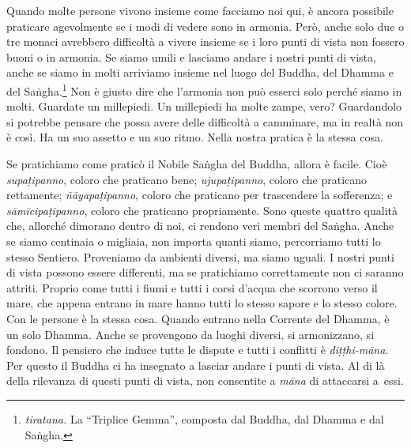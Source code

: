 Quando molte persone vivono insieme come facciamo noi qui, è ancora
possibile praticare agevolmente se i modi di vedere sono in armonia.
Però, anche solo due o tre monaci avrebbero difficoltà a vivere insieme
se i loro punti di vista non fossero buoni o in armonia. Se siamo umili
e lasciamo andare i nostri punti di vista, anche se siamo in molti
arriviamo insieme nel luogo del Buddha, del Dhamma e del
Saṅgha.\footnote{\emph{tiratana.} La ``Triplice Gemma'', composta dal
  Buddha, dal Dhamma e dal Saṅgha.} Non è giusto dire che l'armonia non
può esserci solo perché siamo in molti. Guardate un millepiedi. Un
millepiedi ha molte zampe, vero? Guardandolo si potrebbe pensare che
possa avere delle difficoltà a camminare, ma in realtà non è così. Ha un
suo assetto e un suo ritmo. Nella nostra pratica è la stessa cosa.

Se pratichiamo come praticò il Nobile Saṅgha del Buddha, allora è
facile. Cioè \emph{supaṭipanno}, coloro che praticano bene;
\emph{ujupaṭipanno}, coloro che praticano rettamente;
\emph{ñāyapaṭipanno}, coloro che praticano per trascendere la
sofferenza; e \emph{sāmīcipaṭipanno}, coloro che praticano propriamente.
Sono queste quattro qualità che, allorché dimorano dentro di noi, ci
rendono veri membri del Saṅgha. Anche se siamo centinaia o migliaia, non
importa quanti siamo, percorriamo tutti lo stesso Sentiero. Proveniamo
da ambienti diversi, ma siamo uguali. I nostri punti di vista possono
essere differenti, ma se pratichiamo correttamente non ci saranno
attriti. Proprio come tutti i fiumi e tutti i corsi d'acqua che scorrono
verso il mare, che appena entrano in mare hanno tutti lo stesso sapore e
lo stesso colore. Con le persone è la stessa cosa. Quando entrano nella
Corrente del Dhamma, è un solo Dhamma. Anche se provengono da luoghi
diversi, si armonizzano, si fondono. Il pensiero che induce tutte le
dispute e tutti i conflitti è \emph{diṭṭhi-māna}. Per questo il Buddha
ci ha insegnato a lasciar andare i punti di vista. Al di là della
rilevanza di questi punti di vista, non consentite a \emph{māna} di
attaccarsi a~essi.

